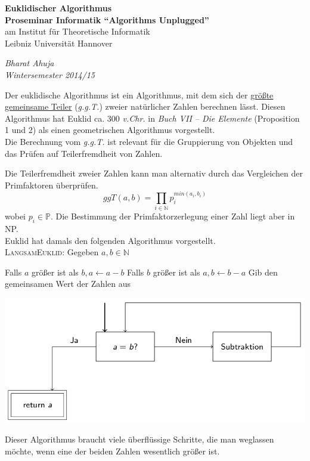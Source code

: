 \documentclass {article}
\begin{document}
\begin{center}
\textbf{Euklidischer Algorithmus\\}
\textbf{Proseminar Informatik ``Algorithms Unplugged''}\\
am Institut f\"ur Theoretische Informatik\\
Leibniz Universit\"at Hannover\\
\end{center}
\begin{flushright}
\textit{Bharat Ahuja\\Wintersemester 2014/15}
\end{flushright}

\noindent\makebox[\linewidth]{\rule{\paperwidth}{0.4pt}}

\vspace*{10pt}
Der euklidische Algorithmus ist ein Algorithmus, mit dem sich der \underline{gr\"o{\ss}te gemeinsame Teiler} (\textit{g.g.T.}) zweier nat\"urlicher Zahlen berechnen l\"asst. Diesen Algorithmus hat Euklid ca. 300 \textit{v.Chr.} in \textit{Buch VII -- Die Elemente} (Proposition 1 und 2) als einen geometrischen Algorithmus vorgestellt.
\\

Die Berechnung vom \textit{g.g.T.} ist relevant f\"ur die Gruppierung von Objekten und das Pr\"ufen auf Teilerfremdheit von Zahlen.
 
Die Teilerfremdheit zweier Zahlen kann man alternativ durch das Vergleichen der Primfaktoren \"uberpr\"ufen.
	$$ggT(a,b) = \prod_{i \in \mathbb{N}} p_{i}^{min(a_i,b_i)}$$ wobei $p_{i} \in \mathbb{P}$.
Die Bestimmung der Primfaktorzerlegung einer Zahl liegt aber in NP.\\

Euklid hat damals den folgenden Algorithmus vorgestellt.\\

\textsc{LangsamEuklid}: Gegeben $a,b \in \mathbb{N}$
\begin{algorithmic}[1]
	\State Falls $a$ gr\"o{\ss}er ist als $b, a\gets a-b$
	\State Falls $b$ gr\"o{\ss}er ist als $a, b\gets b-a$
\EndWhile
	\State Gib den gemeinsamen Wert der Zahlen aus
\end{algorithmic}
\vspace{10pt}
\begin{center}
\includegraphics[scale=0.4]{langsamEuklid}
\end{center}
Dieser Algorithmus braucht viele \"uberfl\"ussige Schritte, die man weglassen m\"ochte, wenn eine der beiden Zahlen wesentlich gr\"o{\ss}er ist.
\end{document}
